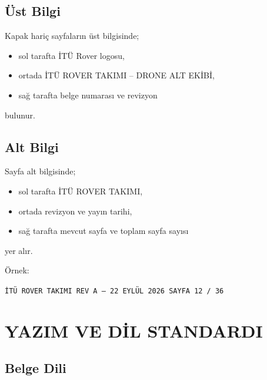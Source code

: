 \documentclass[11pt,a4paper]{article}
\begin{document}
\subsection{Üst Bilgi}

Kapak hariç sayfaların üst bilgisinde;

\begin{itemize}
    \item sol tarafta İTÜ Rover logosu,
    \item ortada İTÜ ROVER TAKIMI -- DRONE ALT EKİBİ,
    \item sağ tarafta belge numarası ve revizyon
\end{itemize}

bulunur.

\subsection{Alt Bilgi}

Sayfa alt bilgisinde;

\begin{itemize}
    \item sol tarafta İTÜ ROVER TAKIMI,
    \item ortada revizyon ve yayın tarihi,
    \item sağ tarafta mevcut sayfa ve toplam sayfa sayısı
\end{itemize}

yer alır.

Örnek:

\begin{center}

\texttt{İTÜ ROVER TAKIMI \hspace{10mm} REV A -- 22 EYLÜL 2026
\hspace{10mm} SAYFA 12 / 36}

\end{center}


\newpage

\section{YAZIM VE DİL STANDARDI}

\subsection{Belge Dili}
\end{document}

